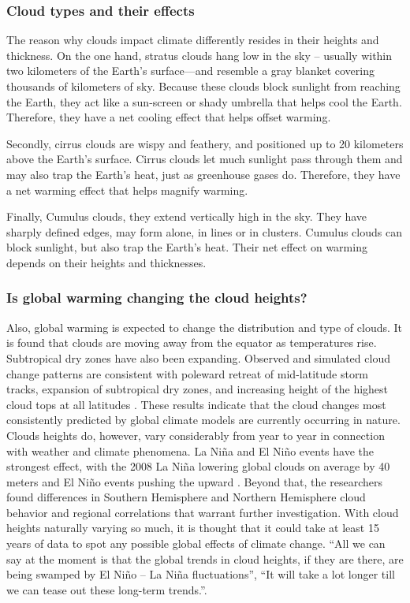 \documentclass{scrartcl}
\begin{document}
\subsubsection{Cloud types and their effects}
The reason why clouds impact climate differently resides in their heights and
thickness. On the one hand, stratus clouds hang low in the sky – usually within
two kilometers of the Earth’s surface—and resemble a gray blanket covering
thousands of kilometers of sky. Because these clouds block sunlight from reaching
the Earth, they act like a sun-screen or shady umbrella that helps cool the Earth.
Therefore, they have a net cooling effect that helps offset warming.

Secondly, cirrus clouds are wispy and feathery, and positioned up to 20 kilometers
above the Earth’s surface. Cirrus clouds let much sunlight pass through them and
may also trap the Earth’s heat, just as greenhouse gases do. Therefore, they have
 a net warming effect that helps magnify warming.

Finally, Cumulus clouds, they extend vertically high in the sky. They have
sharply defined edges, may form alone, in lines or in clusters. Cumulus clouds
can block sunlight, but also trap the Earth’s heat. Their net effect on warming
depends on their heights and thicknesses.
\subsubsection{Is global warming changing the cloud heights?}
Also, global warming is expected to change the distribution and type of clouds.
It is found that clouds are moving away from the equator as temperatures rise.
Subtropical dry zones have also been expanding. Observed and simulated cloud
change patterns are consistent with poleward retreat of mid-latitude storm
 tracks, expansion of subtropical dry zones, and increasing height of the
 highest cloud tops at all latitudes \citep{clouds_high}. These results indicate that the
 cloud changes most consistently predicted by global climate models are currently occurring in
 nature. Clouds heights do, however, vary considerably from year to year
 in connection with weather and
climate phenomena. La Niña and El Niño events have the strongest effect, with
the 2008 La Niña lowering global clouds on average by 40 meters and El Niño
events pushing the upward \citep{lelli}. Beyond that, the researchers found differences
in Southern Hemisphere and Northern Hemisphere cloud behavior and regional
correlations that warrant further investigation. With cloud heights naturally
varying so much, it is thought \citep{clouds_soon} that it could take at least 15 years of data
to spot any possible global effects of climate change. “All we can say at the
moment is that the global trends in cloud heights, if they are there, are being
swamped by El Niño – La Niña fluctuations”, “It will take a lot longer till we
can tease out these long-term trends.”. 
\end{document}
